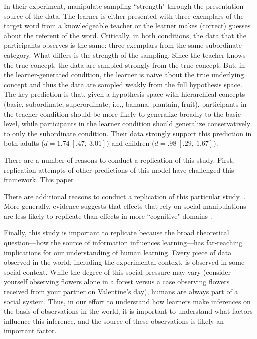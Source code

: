\documentclass[man]{apa2}
\begin{document}
In their experiment,  manipulate  sampling  ``strength"  through  the presentation source of the data. The learner is either presented with three exemplars of the target word from a knowledgeable teacher or the learner makes (correct) guesses about the referent of the word. Critically, in both conditions, the data that the participants observes is the same:  three exemplars from the same subordinate category. What differs is the strength of the sampling.  Since the teacher  knows the true concept, the data are sampled strongly from the true concept. But, in the learner-generated condition, the learner is naive about the true underlying concept and thus the data are sampled weakly from the full hypothesis space.  The key prediction is that, given a hypothesis space with hierarchical concepts (basic, subordinate, superordinate; i.e., banana, plantain, fruit),  participants in the teacher condition should be more likely to generalize broadly to the basic level, while participants in the learner condition should generalize conservatively to only the subordinate condition. Their data strongly support this prediction in both adults ($d = 1.74\ [.47,\ 3.01]$) and children  ($d = .98\ [.29,\ 1.67]$). %


There are a number of reasons to conduct a replication of this study. First, replication attempts of other predictions of this model have challenged this framework. This paper 
\cite{xu2007a}
\cite{spencer2011}
\cite{jenkins2015non}


There are additional reasons to conduct a replication of this particular study. \cite{navarro2012sampling}. More generally, evidence suggests that effects that rely on social manipulations are less likely to replicate than effects in more ``cognitive" domains \cite{reproProj2015}.

Finally, this study is important to replicate because the broad theoretical question---how the source of information influences learning---has far-reaching implications for our understanding of human learning. Every piece of data observed in the world, including the experimental context,  is observed in some social context. While the degree of this social pressure may vary (consider yourself observing flowers  alone in a forest versus a case observing flowers received from your partner on Valentine's day), humans are always part of a social system. Thus, in our effort to understand how learners make inferences on the basis of observations in the world, it is important to understand what factors influence this inference, and the source of these observations is likely an important factor.
\end{document}
